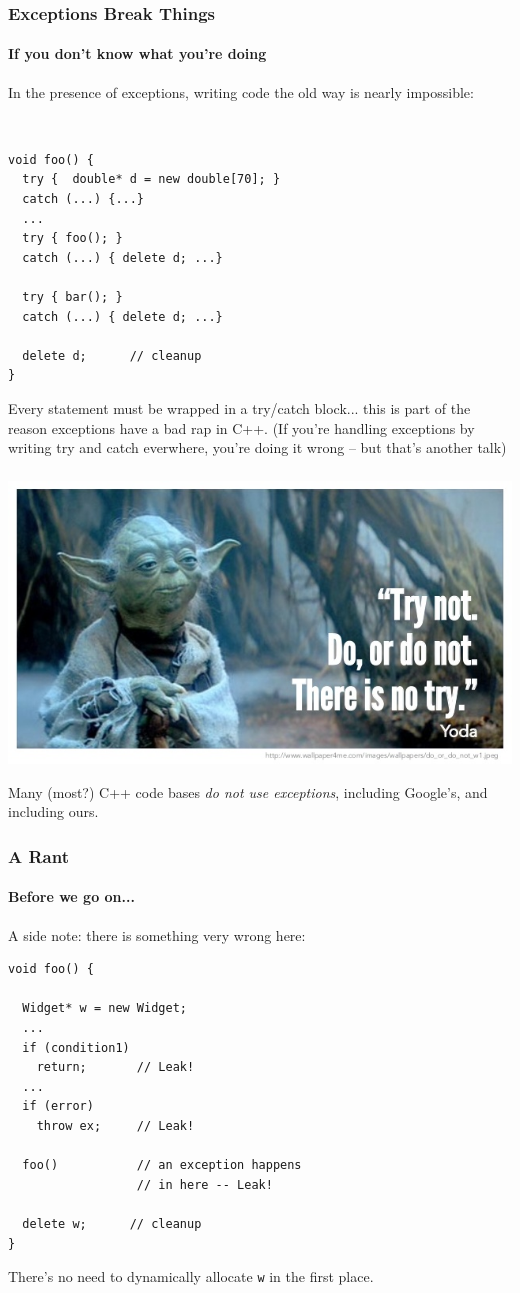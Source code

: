 \begin{frame}[fragile,t]
\frametitle{Exceptions Break Things}
\framesubtitle{If you don't know what you're doing}
In the presence of exceptions, writing code the old way is nearly impossible:
{\scriptsize\
\begin{verbatim}
void foo() {
  try {  double* d = new double[70]; }
  catch (...) {...}
  ...
  try { foo(); }
  catch (...) { delete d; ...}

  try { bar(); } 
  catch (...) { delete d; ...}

  delete d;      // cleanup
}
\end{verbatim}
}
Every statement must be wrapped in a try/catch block... this is part
of the reason exceptions have a bad rap in C++.
\vskip 6pt
(If you're handling exceptions by writing try and catch everwhere,
you're doing it wrong -- but that's another talk)
\end{frame}


\begin{frame}[fragile,t]
\frametitle{}
\includegraphics[scale=0.5]{yoda.jpg}
\begin{center}
Many (most?) C++ code bases \emph{do not use exceptions}, including
Google's, and including ours.
\vskip 6pt
\end{center}
\end{frame}

\begin{frame}[fragile,t]
\frametitle{A Rant}
\framesubtitle{Before we go on...}
A side note: there is something very wrong here:
\pause{}
{\scriptsize \begin{verbatim}
void foo() {

  Widget* w = new Widget;
  ...
  if (condition1)
    return;       // Leak!
  ...
  if (error)
    throw ex;     // Leak!

  foo()           // an exception happens
                  // in here -- Leak!

  delete w;      // cleanup 
}
\end{verbatim}}
\pause
There's no need to dynamically allocate \texttt{w} in the first place.
\vskip 6pt

\end{frame}

